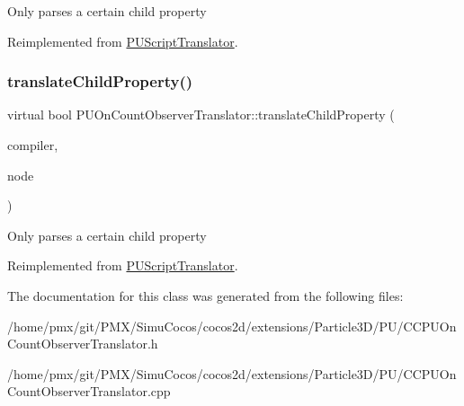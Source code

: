 Only parses a certain child property 

Reimplemented from \hyperlink{classPUScriptTranslator_a0374d83a8a04e57918975d525e0f8fe8}{P\+U\+Script\+Translator}.

\mbox{\label{classPUOnCountObserverTranslator_a027b90626255c0d5fa639d6abe5cbd56}} 
\subsubsection{\texorpdfstring{translate\+Child\+Property()}{translateChildProperty()}\hspace{0.1cm}{\footnotesize\ttfamily [2/2]}}
{\footnotesize\ttfamily virtual bool P\+U\+On\+Count\+Observer\+Translator\+::translate\+Child\+Property (\begin{DoxyParamCaption}\item[{\hyperlink{classPUScriptCompiler}{P\+U\+Script\+Compiler} $\ast$}]{compiler,  }\item[{\hyperlink{classPUAbstractNode}{P\+U\+Abstract\+Node} $\ast$}]{node }\end{DoxyParamCaption})\hspace{0.3cm}{\ttfamily [virtual]}}

Only parses a certain child property 

Reimplemented from \hyperlink{classPUScriptTranslator_a0374d83a8a04e57918975d525e0f8fe8}{P\+U\+Script\+Translator}.



The documentation for this class was generated from the following files\+:\begin{DoxyCompactItemize}
\item 
/home/pmx/git/\+P\+M\+X/\+Simu\+Cocos/cocos2d/extensions/\+Particle3\+D/\+P\+U/C\+C\+P\+U\+On\+Count\+Observer\+Translator.\+h\item 
/home/pmx/git/\+P\+M\+X/\+Simu\+Cocos/cocos2d/extensions/\+Particle3\+D/\+P\+U/C\+C\+P\+U\+On\+Count\+Observer\+Translator.\+cpp\end{DoxyCompactItemize}
